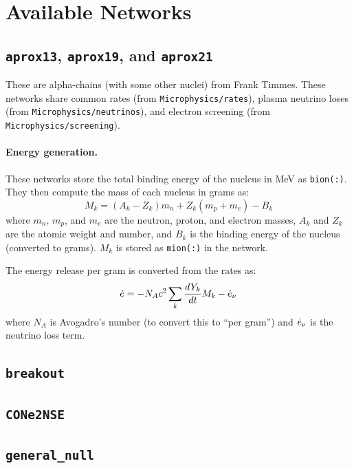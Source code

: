 \section{Available Networks}


\subsection{{\tt aprox13}, {\tt aprox19}, and {\tt aprox21}}

These are alpha-chains (with some other nuclei) from Frank Timmes.
These networks share common rates (from {\tt Microphysics/rates}),
plasma neutrino loses (from {\tt Microphysics/neutrinos}), and
electron screening (from {\tt Microphysics/screening}).

\paragraph{Energy generation.} These networks store the total binding
energy of the nucleus in MeV as {\tt bion(:)}.  They then compute the 
mass of each nucleus in grams as:
\begin{equation}
M_k = (A_k - Z_k) m_n + Z_k (m_p + m_e) - B_k
\end{equation}
where $m_n$, $m_p$, and $m_e$ are the neutron, proton, and electron
masses, $A_k$ and $Z_k$ are the atomic weight and number, and $B_k$
is the binding energy of the nucleus (converted to grams).  $M_k$
is stored as {\tt mion(:)} in the network.

The energy release per gram is converted from the rates as:
\begin{equation}
\dot{e} = -N_A c^2 \sum_k \frac{dY_k}{dt} M_k - \dot{e}_\nu
\end{equation}
where $N_A$ is Avogadro's number (to convert this to ``per gram'')
and $\dot{e}_\nu$ is the neutrino loss term.

\subsection{{\tt breakout}}

\subsection{{\tt CONe2NSE}}

\subsection{{\tt general\_null}}


